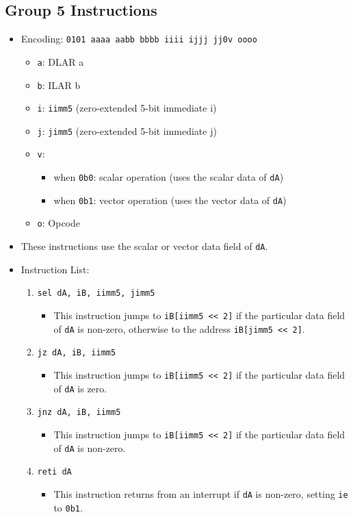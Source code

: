 \documentclass{article}
\begin{document}
	\subsection{Group 5 Instructions}
		\begin{itemize}
		\item Encoding:  \texttt{0101 aaaa aabb bbbb  iiii ijjj jj0v oooo}
			\begin{itemize}
			\item \texttt{a}:  DLAR a
			\item \texttt{b}:  ILAR b
			\item \texttt{i}:  \texttt{iimm5} (zero-extended 5-bit
			immediate i)
			\item \texttt{j}:  \texttt{jimm5} (zero-extended 5-bit
			immediate j)
			\item \texttt{v}:
				\begin{itemize}
				\item when \texttt{0b0}:  scalar operation (uses the scalar
				data of \texttt{dA})
				\item when \texttt{0b1}:  vector operation (uses the vector
				data of \texttt{dA})
				\end{itemize}
			\item \texttt{o}:  Opcode
			\end{itemize}

		\item These instructions use the scalar or vector data field of
		\texttt{dA}.

		\item Instruction List:
			\begin{enumerate}
			\item \texttt{sel dA, iB, iimm5, jimm5}
				\begin{itemize}
				\item This instruction jumps to \texttt{iB[iimm5 << 2]} if
				the particular data field of \texttt{dA}
				is non-zero, otherwise to the address \texttt{iB[jimm5 <<
				2]}.
				\end{itemize}
			\item \texttt{jz dA, iB, iimm5}
				\begin{itemize}
				\item This instruction jumps to \texttt{iB[iimm5 << 2]}
				if the particular data field of \texttt{dA} is zero.
				\end{itemize}
			\item \texttt{jnz dA, iB, iimm5}
				\begin{itemize}
				\item This instruction jumps to \texttt{iB[iimm5 << 2]}
				if the particular data field of \texttt{dA} is non-zero.
				\end{itemize}
			\item \texttt{reti dA}
				\begin{itemize}
				\item This instruction returns from an interrupt if
				\texttt{dA} is non-zero, setting \texttt{ie} to
				\texttt{0b1}.


\end{itemize}
\end{enumerate}
\end{itemize}
\end{document}
